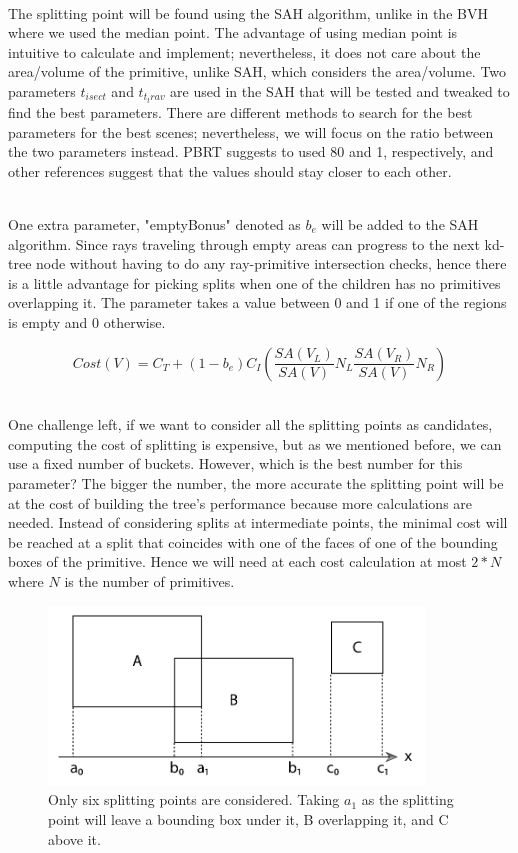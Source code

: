 \documentclass[11pt,a4paper]{article}
\begin{document}
\noindent
\\
The splitting point will be found using the SAH algorithm, unlike in the BVH where we used the median point. The advantage of using median point is intuitive to calculate and implement; nevertheless, it does not care about the area/volume of the primitive, unlike SAH, which considers the area/volume. Two parameters $t_{isect}$ and $t_{t_trav}$ are used in the SAH that will be tested and tweaked to find the best parameters. There are different methods to search for the best parameters for the best scenes; nevertheless, we will focus on the ratio between the two parameters instead. PBRT suggests to used 80 and 1, respectively, and other references suggest that the values should stay closer to each other. 

\noindent
\\
One extra parameter, "emptyBonus" denoted as $b_e$ will be added to the SAH algorithm. Since rays traveling through empty areas can progress to the next kd-tree node without having to do any ray-primitive intersection checks, hence there is a little advantage for picking splits when one of the children has no primitives overlapping it. The parameter takes a value between 0 and 1 if one of the regions is empty and 0 otherwise. 

\begin{equation}
Cost(V) = C_T + (1-b_e)C_I(\frac{SA(V_L)}{SA(V)}N_L \frac{SA(V_R)}{SA(V)}N_R)
\end{equation}

\noindent
\\
One challenge left, if we want to consider all the splitting points as candidates, computing the cost of splitting is expensive, but as we mentioned before, we can use a fixed number of buckets. However, which is the best number for this parameter? The bigger the number, the more accurate the splitting point will be at the cost of building the tree's performance because more calculations are needed. Instead of considering splits at intermediate points, the minimal cost will be reached at a split that coincides with one of the faces of one of the bounding boxes of the primitive. Hence we will need at each cost calculation at most $2 * N$ where $N$ is the number of primitives.

\begin{figure}[H]	
     \centering
     \captionsetup{justification=centering,margin=2cm}
     \includegraphics[width=10cm]{images/kdtree/projected_bboxes.png}
     \caption{Only six splitting points are considered. Taking $a_1$ as the splitting point will leave a bounding box under it, B overlapping it, and C above it. \protect\cite{Pharr2016}}
        \label{fig:dice}
\end{figure}
\end{document}

